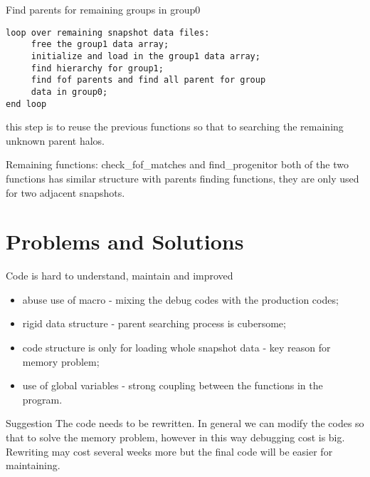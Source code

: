 \documentclass[notheorems, aspectratio=54]{beamer}
\begin{document}
\begin{frame}[fragile]

\begin{block}{Find parents for remaining groups in group0}
 \begin{verbatim}
loop over remaining snapshot data files:
     free the group1 data array;
     initialize and load in the group1 data array;
     find hierarchy for group1;
     find fof parents and find all parent for group 
     data in group0;
end loop
 \end{verbatim}
\end{block}
this step is to reuse the previous functions so that to searching the remaining unknown parent halos.

\end{frame}

\begin{frame}[fragile]

\begin{block}{Remaining functions: check\_fof\_matches and find\_progenitor}
both of the two functions has similar structure with parents finding functions, they are only used
for two adjacent snapshots.
\end{block}

\end{frame}

\section{Problems and Solutions}
\begin{frame}

\begin{block}{Code is hard to understand, maintain and improved} 
 \begin{itemize}
  \item abuse use of macro - mixing the debug codes with the production codes;
  \item rigid data structure - parent searching process is cubersome;
  \item code structure is only for loading whole snapshot data - key reason for memory problem;
  \item use of global variables - strong coupling between the functions in the program.
 \end{itemize}
\end{block}

\begin{block}{Suggestion}
 The code needs to be rewritten. In general we can modify the codes so that to solve the memory
 problem, however in this way debugging cost is big. Rewriting may cost several weeks more but
 the final code will be easier for maintaining.
\end{block}

 
\end{frame}
\end{document}
